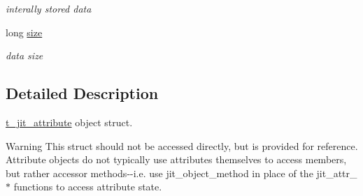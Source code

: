 \begin{DoxyCompactItemize}
\begin{DoxyCompactList}\small\item\em interally stored data \item\end{DoxyCompactList}\item 
\hypertarget{structt__jit__attribute_af5b37ba6e24cbed103a6bc64c6963254}{
long \hyperlink{structt__jit__attribute_af5b37ba6e24cbed103a6bc64c6963254}{size}}
\label{structt__jit__attribute_af5b37ba6e24cbed103a6bc64c6963254}

\begin{DoxyCompactList}\small\item\em data size \item\end{DoxyCompactList}\end{DoxyCompactItemize}


\subsection{Detailed Description}
\hyperlink{structt__jit__attribute}{t\_\-jit\_\-attribute} object struct. \begin{DoxyWarning}{Warning}
This struct should not be accessed directly, but is provided for reference. Attribute objects do not typically use attributes themselves to access members, but rather accessor methods-\/-\/i.e. use jit\_\-object\_\-method in place of the jit\_\-attr\_\-$\ast$ functions to access attribute state. 
\end{DoxyWarning}
